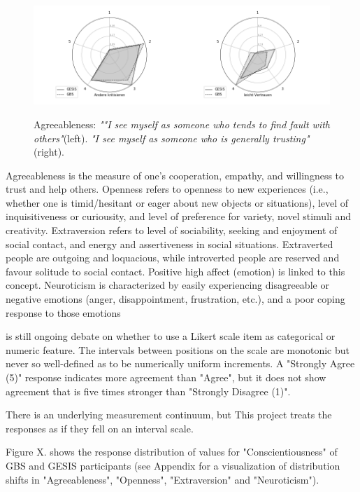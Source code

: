                 \begin{figure}[ht]
                \begin{center}
                   \includegraphics[scale=0.75,angle=0]{fig/Agreeablenessfigure}
	         \label{Agreeableness}
	         \caption{Agreeableness: \textit{""I see myself as someone who tends to find fault with others"}(left). \textit{"I see myself as someone who is generally trusting"}(right).}
                \end{center}
                \end{figure}

Agreeableness is the measure of one's cooperation, empathy, and willingness to trust and help others. Openness refers to openness to new experiences (i.e., whether one is timid/hesitant or eager about new objects or situations), level of inquisitiveness or curiousity, and level of preference for variety, novel stimuli and creativity. Extraversion refers to level of sociability, seeking and enjoyment of social contact, and energy and assertiveness in social situations. Extraverted people are outgoing and loquacious, while introverted people are reserved and favour solitude to social contact. Positive high affect (emotion) is linked to this concept. Neuroticism is characterized by easily experiencing disagreeable or negative emotions (anger, disappointment, frustration, etc.), and a poor coping response to those emotions

 is still ongoing debate on whether to use a Likert scale item as categorical or numeric feature. The intervals between positions on the scale are monotonic but never so well-defined as to be numerically uniform increments. A "Strongly Agree (5)" response indicates more agreement than "Agree", but it does not show agreement that is five times stronger than "Strongly Disagree (1)". 

There is an underlying measurement continuum, but  
This project treats the responses as if they fell on an interval scale.

Figure X. shows the response distribution of values for "Conscientiousness" of GBS and GESIS participants (see Appendix for a visualization of distribution shifts in "Agreeableness", "Openness", "Extraversion" and "Neuroticism").

